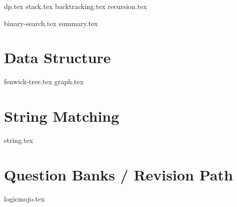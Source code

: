 \documentclass{../latex-setting/cmemoir}
\begin{document}

\frontmatter

\tableofcontents

\restoregeometry%

\mainmatter{}


{dp.tex}
{stack.tex}
{backtracking.tex}
{recursion.tex}

{binary-search.tex}
{summary.tex}



\part{Data Structure}
{fenwick-tree.tex}
{graph.tex}



\part{String Matching}
{string.tex}

\part{ Question Banks / Revision Path}
{logicmojo.tex}
% 
\end{document}
